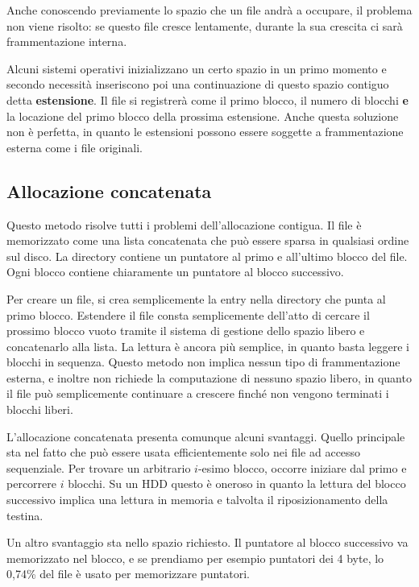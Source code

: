         Anche conoscendo previamente lo spazio che un file andrà a occupare, il problema non viene risolto: se questo file cresce lentamente, durante la sua crescita ci sarà frammentazione interna.
        
        Alcuni sistemi operativi inizializzano un certo spazio in un primo momento e secondo necessità inseriscono poi una continuazione di questo spazio contiguo detta \textbf{estensione}. Il file si registrerà come il primo blocco, il numero di blocchi \textbf{e} la locazione del primo blocco della prossima estensione. Anche questa soluzione non è perfetta, in quanto le estensioni possono essere soggette a frammentazione esterna come i file originali.
        
    \subsection{Allocazione concatenata}
        Questo metodo risolve tutti i problemi dell'allocazione contigua. Il file è memorizzato come una lista concatenata che può essere sparsa in qualsiasi ordine sul disco. La directory contiene un puntatore al primo e all'ultimo blocco del file. Ogni blocco contiene chiaramente un puntatore al blocco successivo.
        
        Per creare un file, si crea semplicemente la entry nella directory che punta al primo blocco. Estendere il file consta semplicemente dell'atto di cercare il prossimo blocco vuoto tramite il sistema di gestione dello spazio libero e concatenarlo alla lista. La lettura è ancora più semplice, in quanto basta leggere i blocchi in sequenza. Questo metodo non implica nessun tipo di frammentazione esterna, e inoltre non richiede la computazione di nessuno spazio libero, in quanto il file può semplicemente continuare a crescere finché non vengono terminati i blocchi liberi.
        
        L'allocazione concatenata presenta comunque alcuni svantaggi. Quello principale sta nel fatto che può essere usata efficientemente solo nei file ad accesso sequenziale. Per trovare un arbitrario $i$-esimo blocco, occorre iniziare dal primo e percorrere $i$ blocchi. Su un HDD questo è oneroso in quanto la lettura del blocco successivo implica una lettura in memoria e talvolta il riposizionamento della testina.
        
        Un altro svantaggio sta nello spazio richiesto. Il puntatore al blocco successivo va memorizzato nel blocco, e se prendiamo per esempio puntatori dei 4 byte, lo 0,74\% del file è usato per memorizzare puntatori.
        
